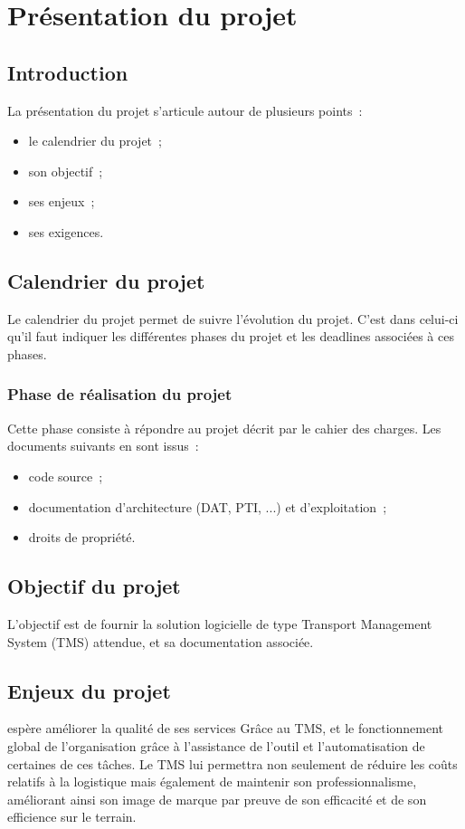 \chapter{Présentation du projet}

% 

\section{Introduction}
La présentation du projet s'articule autour de plusieurs points~: 
\begin{itemize}
   \item le calendrier du projet~;
   \item son objectif~;
   \item ses enjeux~;
   \item ses exigences.
\end{itemize}

\section{Calendrier du projet}
Le calendrier du projet permet de suivre l'évolution du projet. C'est dans celui-ci qu'il faut indiquer les différentes phases du projet et les deadlines associées à ces phases.

\subsection{Phase de réalisation du projet}
Cette phase consiste à répondre au projet décrit par le cahier des charges. Les documents suivants en sont issus~:
\begin{itemize}
	\item code source~;
	\item documentation d'architecture (DAT, PTI, ...) et d'exploitation~;
	\item droits de propriété.
\end{itemize}

\section{Objectif du projet}
L'objectif est de fournir la solution logicielle de type Transport Management System (TMS) attendue, et sa documentation associée.
 
\section{Enjeux du projet}
\mo espère améliorer la qualité de ses services Grâce au TMS, et le fonctionnement global de l'organisation grâce à l'assistance de l'outil et l'automatisation de certaines de ces tâches. Le TMS lui permettra non seulement de réduire les coûts relatifs à la logistique mais également de maintenir son professionnalisme, améliorant ainsi son image de marque par preuve de son efficacité et de son efficience sur le terrain.

